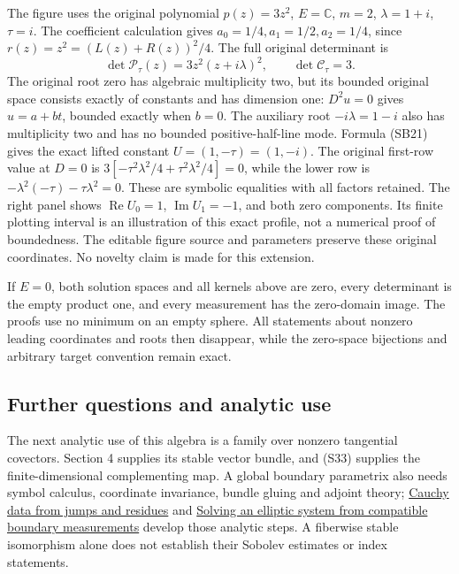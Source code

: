 \documentclass[
  11pt,
]{article}
\begin{document}
The figure uses the original polynomial \(p(z)=3z^2\), \(E=\mathbb C\),
\(m=2\), \(\lambda=1+i\), \(\tau=i\). The coefficient calculation gives
\(a_0=1/4,a_1=1/2,a_2=1/4\), since \(r(z)=z^2=(L(z)+R(z))^2/4\). The
full original determinant is \[
 \det\mathcal P_\tau(z)=3z^2(z+i\lambda)^2,
                  \qquad\det\mathcal C_\tau=3.
 \tag{SB28}
\] The original root zero has algebraic multiplicity two, but its
bounded original space consists exactly of constants and has dimension
one: \(D^2u=0\) gives \(u=a+bt\), bounded exactly when \(b=0\). The
auxiliary root \(-i\lambda=1-i\) also has multiplicity two and has no
bounded positive-half-line mode. Formula (SB21) gives the exact lifted
constant \(U=(1,-\tau)=(1,-i)\). The original first-row value at \(D=0\)
is \(3[-\tau^2\lambda^2/4+\tau^2\lambda^2/4]=0\), while the lower row is
\(-\lambda^2(-\tau)-\tau\lambda^2=0\). These are symbolic equalities
with all factors retained. The right panel shows
\(\operatorname{Re}U_0=1\), \(\operatorname{Im}U_1=-1\), and both zero
components. Its finite plotting interval is an illustration of this
exact profile, not a numerical proof of boundedness. The editable figure
source and parameters preserve these original coordinates. No novelty
claim is made for this extension.

If \(E=0\), both solution spaces and all kernels above are zero, every
determinant is the empty product one, and every measurement has the
zero-domain image. The proofs use no minimum on an empty sphere. All
statements about nonzero leading coordinates and roots then disappear,
while the zero-space bijections and arbitrary target convention remain
exact.

\subsection{Further questions and analytic
use}\label{further-questions-and-analytic-use}

The next analytic use of this algebra is a family over nonzero
tangential covectors. Section 4 supplies its stable vector bundle, and
(S33) supplies the finite-dimensional complementing map. A global
boundary parametrix also needs symbol calculus, coordinate invariance,
bundle gluing and adjoint theory; \href{calderon-cauchy-data.pdf}{Cauchy
data from jumps and residues} and
\href{general-boundary-fredholm.pdf}{Solving an elliptic system from
compatible boundary measurements} develop those analytic steps. A
fiberwise stable isomorphism alone does not establish their Sobolev
estimates or index statements.
\end{document}
